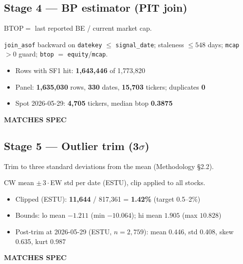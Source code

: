 \documentclass[11pt,a4paper]{article}
\newcommand{\PASS}[1]{\textcolor{pass}{\textbf{#1}}}
\begin{document}
\subsection{Stage 4 --- BP estimator (PIT join)}

\begin{description}[style=nextline]
  \item[PDF SPEC] $\mathrm{BTOP} = $ last reported BE / current market cap.
  \item[Implementation] \texttt{join\_asof} backward on \texttt{datekey} $\leq$ \texttt{signal\_date}; staleness $\leq 548$ days; \texttt{mcap} $> 0$ guard; \texttt{btop} $=$ \texttt{equity}/\texttt{mcap}.
  \item[Observed]\phantom{x}
    \begin{itemize}[nosep, topsep=-\parskip]
      \item Rows with SF1 hit: \textbf{1{,}643{,}446} of 1{,}773{,}820
      \item Panel: \textbf{1{,}635{,}030} rows, \textbf{330} dates, \textbf{15{,}703} tickers; duplicates \textbf{0}
      \item Spot 2026-05-29: \textbf{4{,}705} tickers, median btop \textbf{0.3875}
    \end{itemize}
  \item[Status] \PASS{MATCHES SPEC}
\end{description}

\subsection{Stage 5 --- Outlier trim (3$\sigma$)}

\begin{description}[style=nextline]
  \item[PDF SPEC] Trim to three standard deviations from the mean (Methodology \S2.2).
  \item[Implementation] CW mean $\pm\,3\cdot$EW std per date (ESTU), clip applied to all stocks.
  \item[Observed]\phantom{x}
    \begin{itemize}[nosep, topsep=-\parskip]
      \item Clipped (ESTU): \textbf{11{,}644} / 817{,}361 = \textbf{1.42\%} (target 0.5--2\%)
      \item Bounds: lo mean $-1.211$ (min $-10.064$); hi mean $1.905$ (max $10.828$)
      \item Post-trim at 2026-05-29 (ESTU, $n=2{,}759$): mean 0.446, std 0.408, skew 0.635, kurt 0.987
    \end{itemize}
  \item[Status] \PASS{MATCHES SPEC}
\end{description}
\end{document}
